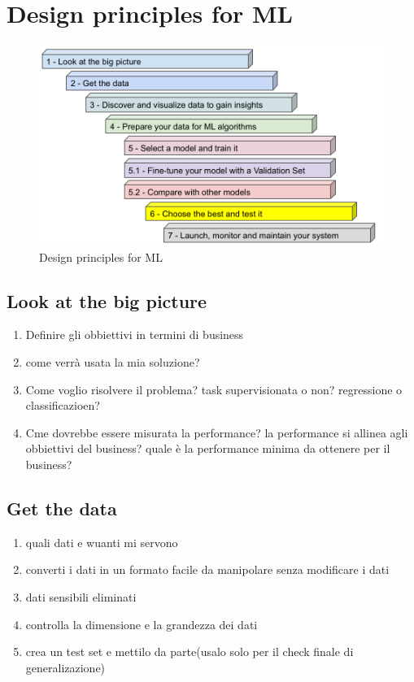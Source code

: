 \section{Design principles for ML}


\begin{figure}[H]
    \centering
    \includegraphics[width=0.6\linewidth]{imgs/design-principles-for-ml}
    \caption{Design principles for ML}
    \label{fig:Design_principles}
\end{figure}

\subsection{Look at the big picture}
\begin{enumerate}
    \item Definire gli obbiettivi in termini di business
    \item come verrà usata la mia soluzione?
    \item Come voglio risolvere il problema? task supervisionata o non? regressione o classificazioen?
    \item Cme dovrebbe essere misurata la performance? la performance si allinea agli
    obbiettivi del business? quale è la performance minima da ottenere per il business?
\end{enumerate}


\subsection{Get the data}
\begin{enumerate}
    \item quali dati e wuanti mi servono
    \item converti i dati in un formato facile da manipolare senza modificare i dati
    \item dati sensibili eliminati
    \item controlla la dimensione e la grandezza dei dati
    \item crea un test set e mettilo da parte(usalo solo per il check finale di generalizazione)
\end{enumerate}


